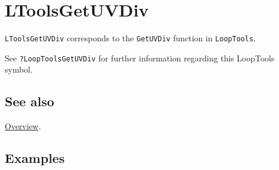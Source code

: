 \documentclass[../FeynHelpersManual.tex]{subfiles}
\begin{document}
\hypertarget{ltoolsgetuvdiv}{
\section{LToolsGetUVDiv}\label{ltoolsgetuvdiv}}

\texttt{LToolsGetUVDiv} corresponds to the \texttt{GetUVDiv} function in
\texttt{LoopTools}.

See \texttt{?LoopTools\textasciigrave GetUVDiv} for further information
regarding this LoopTools symbol.

\subsection{See also}

\hyperlink{toc}{Overview}.

\subsection{Examples}
\end{document}
